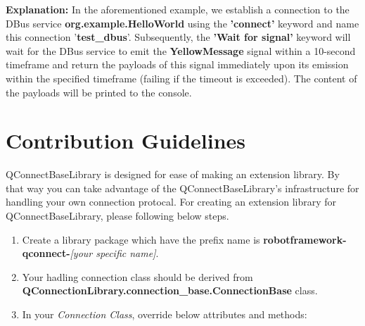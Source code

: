 \textbf{Explanation:}
In the aforementioned example, we establish a connection to the DBus service \textbf{org.example.HelloWorld} using the \textbf{'connect'} keyword and name this connection '\textbf{test\_dbus}'. 
Subsequently, the \textbf{'Wait for signal'} keyword will wait for the DBus service to emit the \textbf{YellowMessage} signal within a 10-second timeframe and return the payloads of this signal 
immediately upon its emission within the specified timeframe (failing if the timeout is exceeded). The content of the payloads will be printed to the console.




\hypertarget{contribution-guidelines}{%
\section{Contribution Guidelines}\label{contribution-guidelines}}

QConnectBaseLibrary is designed for ease of making an extension library.
By that way you can take advantage of the QConnectBaseLibrary's
infrastructure for handling your own connection protocal. For creating
an extension library for QConnectBaseLibrary, please following below
steps.

\begin{enumerate}
\def\labelenumi{\arabic{enumi}.}
\tightlist
\item
  Create a library package which have the prefix name is
  \textbf{robotframework-qconnect-}\emph{{[}your specific name{]}}.
\item
  Your hadling connection class should be derived from
  \textbf{QConnectionLibrary.connection\_base.ConnectionBase} class.
\item
  In your \emph{Connection Class}, override below attributes and
  methods:
\end{enumerate}

